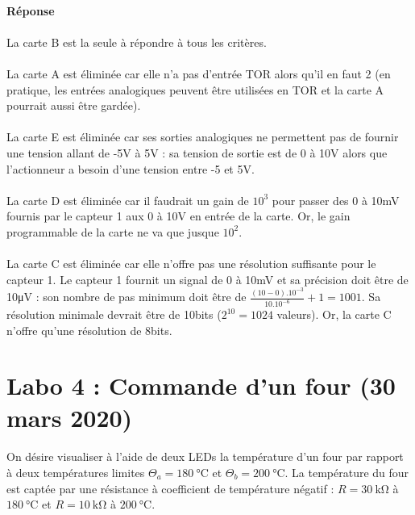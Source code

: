 \documentclass{article}
\begin{document}
\paragraph{Réponse}
\paragraph{}
La carte B est la seule à répondre à tous les critères.

\paragraph{}
La carte A est éliminée car elle n'a pas d'entrée TOR alors qu'il en faut 2 (en pratique, les entrées analogiques peuvent être utilisées en TOR et la carte A pourrait aussi être gardée).

\paragraph{}
La carte E est éliminée car ses sorties analogiques ne permettent pas de fournir une tension allant de -5V à 5V : sa tension de sortie est de 0 à 10V alors que l'actionneur a besoin d'une tension entre -5 et 5V.

\paragraph{}
La carte D est éliminée car il faudrait un gain de $10^3$ pour passer des 0 à 10mV fournis par le capteur 1 aux 0 à 10V en entrée de la carte. Or, le gain programmable de la carte ne va que jusque $10^2$.

\paragraph{}
La carte C est éliminée car elle n'offre pas une résolution suffisante pour le capteur 1. Le capteur 1 fournit un signal de 0 à 10mV et sa précision doit être de 10\si{\micro\volt} : son nombre de pas minimum doit être de $\frac{(10-0).10^{-3}}{10.10^{-6}} + 1 = 1001$. Sa résolution minimale devrait être de 10bits ($2^{10} = 1024$ valeurs). Or, la carte C n'offre qu'une résolution de 8bits.


\newpage
\section{Labo 4 : Commande d'un four (30 mars 2020)}
\paragraph{}
On désire visualiser à l'aide de deux LEDs la température d'un four par rapport à deux températures limites $\Theta_a = \SI{180}{\celsius}$ et $\Theta_b = \SI{200}{\celsius}$. La température du four est captée par une résistance à coefficient de température négatif : $R = \SI{30}{\kilo\ohm}$ à $\SI{180}{\celsius}$ et $R = \SI{10}{\kilo\ohm}$ à $\SI{200}{\celsius}$.
\end{document}

